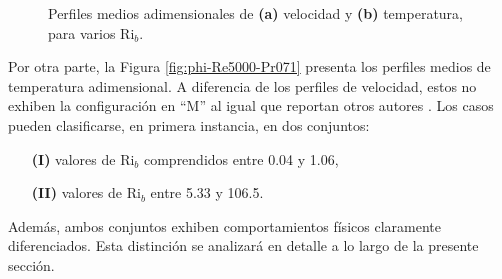 \begin{figure}[H]
  \centering
  \caption{Perfiles medios adimensionales de \textbf{(a)} velocidad y \textbf{(b)} temperatura, para varios Ri$_b$.}
\end{figure}

Por otra parte, la Figura \ref{fig:phi-Re5000-Pr071} presenta los perfiles medios de temperatura adimensional. A diferencia de los perfiles de velocidad, estos no exhiben la configuración en ``M'' al igual que reportan otros autores \cite{you2003direct, steiner1971reverse}. Los casos pueden clasificarse, en primera instancia, en dos conjuntos:

\begin{itemize}

\item[\textbf{(I)}] valores de Ri$_b$ comprendidos entre 0.04 y 1.06,

\item[\textbf{(II)}] valores de Ri$_b$ entre 5.33 y 106.5.

\end{itemize}
Además, ambos conjuntos exhiben comportamientos físicos claramente diferenciados. Esta distinción se analizará en detalle a lo largo de la presente sección.

